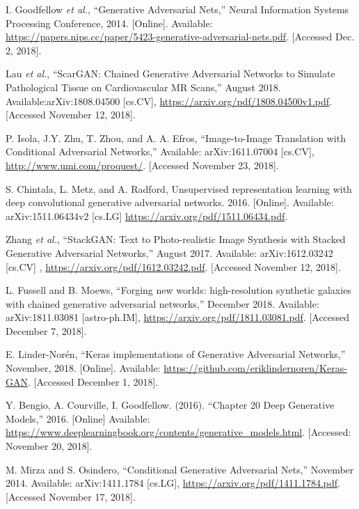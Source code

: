\documentclass[conference]{IEEEtran}
\begin{document}
\begin{thebibliography}{00}

 I. Goodfellow \textit{et al.}, ``Generative Adversarial Nets,''
Neural Information Systems Processing Conference, 2014.  [Online]. Available:
\url{https://papers.nips.cc/paper/5423-generative-adversarial-nets.pdf}. [Accessed 
Dec. 2, 2018].
 
 Lau \textit{et al.}, ``ScarGAN: Chained Generative Adversarial
  Networks to Simulate Pathological Tissue on Cardiovascular MR Scans,'' August
2018. Available:arXiv:1808.04500 [cs.CV], 
\url{https://arxiv.org/pdf/1808.04500v1.pdf}.  [Accessed November 12, 2018].

 P. Isola, J.Y. Zhu, T. Zhou, and A. A. Efros, ``Image-to-Image
Translation with Conditional Adversarial Networks,'' Available:
arXiv:1611.07004 [cs.CV], \url{http://www.umi.com/proquest/}. [Accessed November
23, 2018].

 S. Chintala, L. Metz, and A. Radford,
Unsupervised representation learning with deep convolutional generative
adversarial networks.  2016. [Online]. Available: arXiv:1511.06434v2 [cs.LG]
\url{https://arxiv.org/pdf/1511.06434.pdf}. 

 Zhang \textit{et al.}, ``StackGAN: Text to Photo-realistic
Image Synthesis with Stacked Generative Adversarial Networks,'' August 2017. 
Available:  arXiv:1612.03242 [cs.CV] , \url{https://arxiv.org/pdf/1612.03242.pdf}.
[Accessed November 12, 2018].

 L. Fussell and B. Moews, ``Forging new worlds: high-resolution
synthetic galaxies with chained generative adversarial networks,'' 
December 2018. Available: arXiv:1811.03081 [astro-ph.IM],
\url{https://arxiv.org/pdf/1811.03081.pdf}.  [Accessed December 7, 2018].

 E. Linder-Nor\'en, “Keras implementations of
Generative Adversarial Networks,” November, 2018.  [Online].
Available: \url{https://github.com/eriklindernoren/Keras-GAN}.
[Accessed December 1, 2018].

 Y. Bengio, A. Courville, I. Goodfellow. (2016).
``Chapter 20 Deep Generative Models,'' 2016. [Online] Available:
\url{https://www.deeplearningbook.org/contents/generative\_models.html}.
[Accessed: November 20, 2018].

 M. Mirza and S. Osindero, ``Conditional Generative Adversarial
Nets,'' November 2014. Available: arXiv:1411.1784 [cs.LG],
\url{https://arxiv.org/pdf/1411.1784.pdf}.  [Accessed November 17, 2018].


\end{thebibliography}
\end{document}
